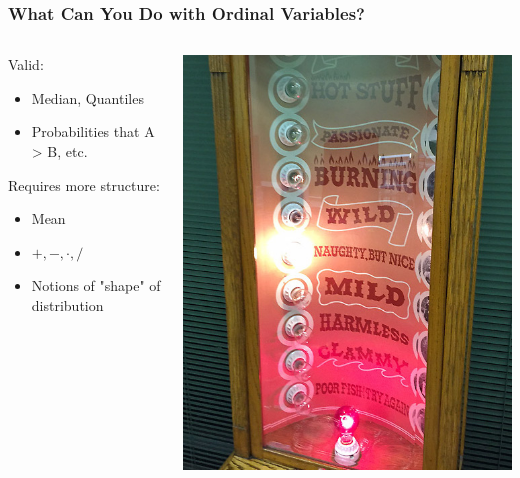 \documentclass[12pt, block=fill]{beamer}
\begin{document}
\begin{frame}
  \frametitle{What Can You Do with Ordinal Variables?}
        \begin{columns}
\begin{column}{0.45\textwidth}


Valid:
\begin{itemize}
\item Median, Quantiles
\item Probabilities that A > B, etc.
\end{itemize}

Requires more structure:
\begin{itemize}
\item Mean
\item $+,-,\cdot, /$
\item Notions of "shape" of distribution
\end{itemize}

  \end{column}
\begin{column}{0.53\textwidth}
\vspace{.5cm}
\includegraphics[width = \textwidth]{figures/love_tester}
  \end{column}
  \end{columns}
\end{frame}
\end{document}
